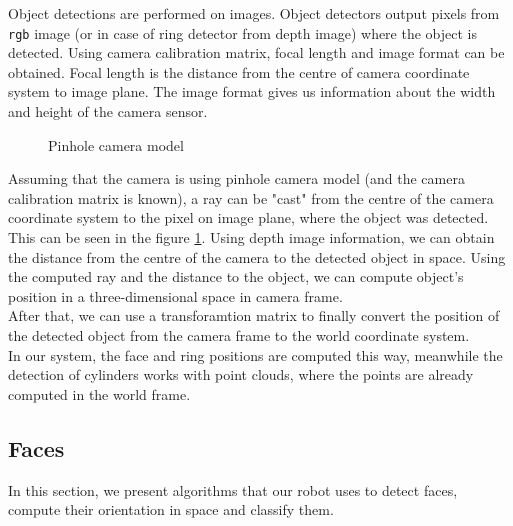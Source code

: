 \documentclass[12pt,a4paper]{article}
\begin{document}
	Object detections are performed on images. Object detectors output pixels from \texttt{rgb} image (or in case of ring detector from depth image) where the object is detected. Using camera calibration matrix, focal length and image format can be obtained. Focal length is the distance from the centre of camera coordinate system to image plane. The image format gives us information about the width and height of the camera sensor. \\

	\begin{figure}[h]
		\centering
		\caption{Pinhole camera model}
		\label{fig:pinhole_camera_model}
	\end{figure}
	
	
	Assuming that the camera is using pinhole camera model (and the camera calibration matrix is known), a ray can be "cast" from the centre of the camera coordinate system to the pixel on image plane, where the object was detected. This can be seen in the figure \ref{fig:pinhole_camera_model}. Using depth image information, we can obtain the distance from the centre of the camera to the detected object in space. Using the computed ray and the distance to the object, we can compute object's position in a three-dimensional space in camera frame. \\
	
	After that, we can use a transforamtion matrix to finally convert the position of the detected object from the camera frame to the world coordinate system. \\ 
	
	In our system, the face and ring positions are computed this way, meanwhile the detection of cylinders works with point clouds, where the points are already computed in the world frame.
	
	\subsection{Faces}
	In this section, we present algorithms that our robot uses to detect faces, compute their orientation in space and classify them.
	
\end{document}
